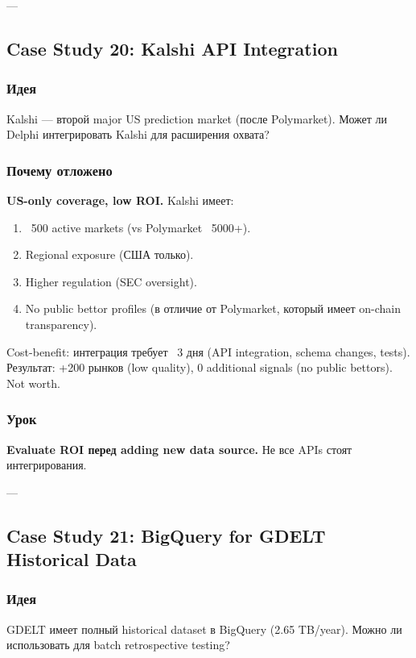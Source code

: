 ---

\subsection{Case Study 20: Kalshi API Integration}

\subsubsection*{Идея}
Kalshi --- второй major US prediction market (после Polymarket). Может ли Delphi интегрировать Kalshi для расширения охвата?

\subsubsection*{Почему отложено}
\textbf{US-only coverage, low ROI.} Kalshi имеет:
\begin{enumerate}
\item ~500 active markets (vs Polymarket ~5000+).
\item Regional exposure (США только).
\item Higher regulation (SEC oversight).
\item No public bettor profiles (в отличие от Polymarket, который имеет on-chain transparency).
\end{enumerate}

Cost-benefit: интеграция требует ~3 дня (API integration, schema changes, tests). Результат: +200 рынков (low quality), 0 additional signals (no public bettors). Not worth.

\subsubsection*{Урок}
\textbf{Evaluate ROI перед adding new data source.} Не все APIs стоят интегрирования.

---

\subsection{Case Study 21: BigQuery for GDELT Historical Data}

\subsubsection*{Идея}
GDELT имеет полный historical dataset в BigQuery (2.65 TB/year). Можно ли использовать для batch retrospective testing?

